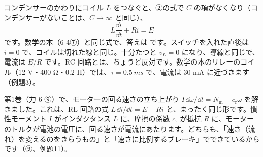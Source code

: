 \begin{phflow}
\end{phflow}

\label{ph:電-9:sec4}
コンデンサーのかわりにコイル $L$ をつなぐと、②の式で $C$ の項がなくなり（コンデンサーがないことは、$C\to\infty$ と同じ）、
\[ L\frac{\dd i}{\dd t}+Ri=E \]
です。数学の本（6-4⑦）と同じ式で、答えは
です。スイッチを入れた直後は $i=0$ で、コイルは切れた線と同じ。十分たつと $v_L=0$ になり、導線と同じで、電流は $E/R$ です。RC 回路とは、ちょうど反対です。数学の本のリレーのコイル（12 V・400 Ω・0.2 H）では、$\tau=\qty{0.5}{ms}$ で、電流は 30 mA に近づきます（例題3）。

\begin{phmijika}[モーターの立ち上がりと同じ形]
第1巻（力-6 ⑨）で、モーターの回る速さの立ち上がり $I\,\dd\omega/\dd t=N_{\mathrm m}-c_{\mathrm r}\omega$ を解きました。これは、RL 回路の式 $L\,\dd i/\dd t=E-Ri$ と、まったく同じ形です。慣性モーメント $I$ がインダクタンス $L$ に、摩擦の係数 $c_{\mathrm r}$ が抵抗 $R$ に、モーターのトルクが電池の電圧に、回る速さが電流にあたります。どちらも、「速さ（流れ）を変えるのをきらうもの」と「速さに比例するブレーキ」でできているからです（⑨、例題11）。
\end{phmijika}

